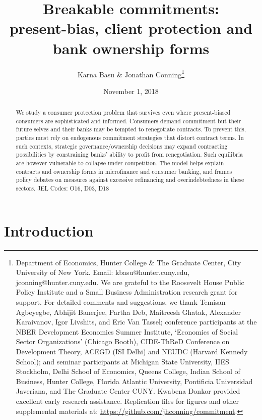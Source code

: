 \documentclass[11pt,english]{article}
\date{November 1, 2018}\usepackage{babel}
\theoremstyle{plain}
\theoremstyle{definition}
\begin{document}
\title{Breakable commitments: \\
 present-bias, client protection and bank ownership forms}

\author{Karna Basu \& Jonathan Conning\thanks{Department of Economics, Hunter College \& The Graduate Center, City
University of New York. Email: kbasu@hunter.cuny.edu, jconning@hunter.cuny.edu.
We are grateful to the Roosevelt House Public Policy Institute and
a Small Business Administration research grant for support. For detailed
comments and suggestions, we thank Temisan Agbeyegbe, Abhijit Banerjee,
Partha Deb, Maitreesh Ghatak, Alexander Karaivanov, Igor Livshits,
and Eric Van Tassel; conference participants at the NBER Development
Economics Summer Institute, `Economics of Social Sector Organizations'
(Chicago Booth), CIDE-ThReD Conference on Development Theory, ACEGD
(ISI Delhi) and NEUDC (Harvard Kennedy School); and seminar participants
at Michigan State University, IIES Stockholm, Delhi School of Economics,
Queens College, Indian School of Business, Hunter College, Florida
Atlantic University, Pontificia Universidad Javeriana, and The Graduate
Center CUNY. Kwabena Donkor provided excellent early research assistance.
Replication files for figures and other supplemental materials at:
\protect\protect\protect\url{https://github.com/jhconning/commitment}.}}
\maketitle 
\begin{abstract}
We study a consumer protection problem that survives even where present-biased consumers are sophisticated and informed. Consumers demand commitment but their future selves and their banks may be tempted to renegotiate contracts. To prevent this, parties must rely on endogenous commitment strategies that distort contract terms. In such contexts, strategic governance/ownership decisions may expand contracting possibilities by constraining banks' ability to profit from renegotiation. Such equilibria are however vulnerable to collapse under competition. The model helps explain contracts and ownership forms in microfinance and consumer banking, and frames policy debates on measures against excessive refinancing and overindebtedness in these sectors. JEL Codes: O16, D03, D18 
\end{abstract}
\newpage{}

\section{Introduction}
\end{document}
